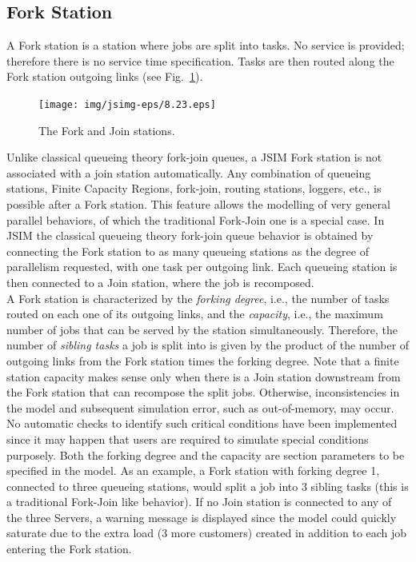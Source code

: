 \subsection{Fork Station}
\label{fstlab}
 A Fork station is a station where jobs
are split into tasks. No service is provided; therefore there is
no service time specification. Tasks are then routed along the
Fork station outgoing links (see Fig.~\ref{fig:forkprop}).\\
\begin{figure}[htb]
    \begin{center}
        \texttt{[image: img/jsimg-eps/8.23.eps]}
    \end{center}
    \caption{The Fork and Join stations.}
    \label{fig:forkprop}
\end{figure}
Unlike classical queueing theory fork-join queues, a JSIM Fork
station is not associated with a join station automatically. Any
combination of queueing stations, Finite Capacity Regions,
fork-join, routing stations, loggers, etc., is possible after a
Fork station. This feature allows the modelling of very general
parallel behaviors, of which the traditional Fork-Join one is a
special case. In JSIM the classical queueing theory fork-join
queue behavior is obtained by connecting the Fork station to as
many queueing stations as the degree of parallelism requested,
with one task per outgoing link. Each queueing station is then
connected to a Join station, where the job is recomposed.\\ A Fork
station is characterized by the \emph{forking degree}, i.e., the
number of tasks routed on each one of its outgoing links, and the
\emph{capacity}, i.e., the maximum number of jobs that can be
served by the station simultaneously. Therefore, the number of
\emph{sibling tasks} a job is split into is given by the product
of the number of outgoing links from the Fork station times the
forking degree. Note that a finite station capacity makes sense
only when there is a Join station downstream from the Fork station
that can recompose the split jobs. Otherwise, inconsistencies in
the model and subsequent simulation error, such as out-of-memory,
may occur. No automatic checks to identify such critical
conditions have been implemented since it may happen that users
are required to simulate special conditions purposely. Both the
forking degree and the capacity are section parameters to be
specified in the model. As an example, a Fork station with forking
degree 1, connected to three queueing stations, would split a job
into 3 sibling tasks (this is a traditional Fork-Join like
behavior). If no Join station is connected to any of the three
Servers, a warning message is displayed since the model could
quickly saturate due to the extra load (3 more customers) created
in addition to each job entering
the Fork station.\\

